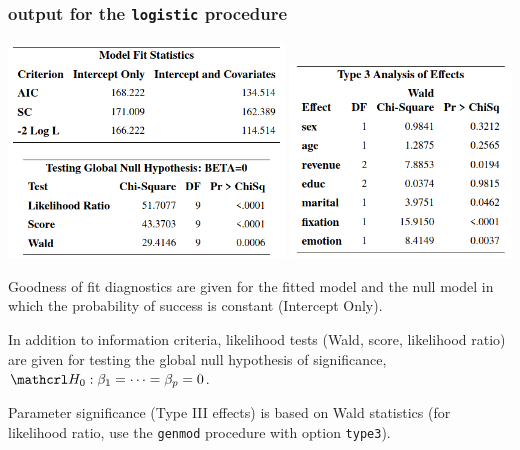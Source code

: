 \documentclass{beamer}
\begin{document}
\begin{frame}
\frametitle{\SASlang{} output for the \texttt{logistic} procedure}
\begin{center}
\includegraphics[width=0.55\textwidth]{img/c4/slides8-e11}
\includegraphics[width=0.44\textwidth]{img/c4/slides8-e12}
\end{center}
{\small 
\bi \item Goodness of fit diagnostics are given for the fitted model and the null model in which the probability of success is constant (Intercept Only). 
\item In addition to information criteria, likelihood tests (Wald, score, likelihood ratio) are given for testing the global null hypothesis of significance, $\Hy_0: \beta_1 = \cdots = \beta_p = 0$.
\item Parameter significance (Type III effects) is based on Wald statistics (for likelihood ratio, use the \texttt{genmod} procedure with option \texttt{type3}).
\ei
}
\end{frame}
\end{document}
